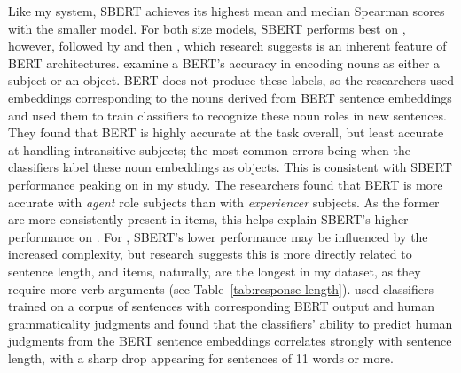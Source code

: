 
Like my system, SBERT achieves its highest mean and median Spearman scores with the smaller model. For both size models, SBERT performs best on , however, followed by  and then , which research suggests is an inherent feature of BERT architectures. \citet{papadimitriou2021multilingual} examine a BERT's accuracy in encoding nouns as either a subject or an object. BERT does not produce these labels, so the researchers used embeddings corresponding to the nouns derived from BERT sentence embeddings and used them to train classifiers to recognize these noun roles in new sentences. They found that BERT is highly accurate at the task overall, but least accurate at handling intransitive subjects; the most common errors being when the classifiers label these noun embeddings as objects. This is consistent with SBERT performance peaking on  in my study. The researchers found that BERT is more accurate with \textit{agent} role subjects than with \textit{experiencer} subjects. As the former are more consistently present in  items, this helps explain SBERT's higher performance on . For , SBERT's lower performance may be influenced by the increased complexity, but research suggests this is more directly related to sentence length, and  items, naturally, are the longest in my dataset, as they require more verb arguments (see Table~\ref{tab:response-length}). \citet{warstadt2019} used classifiers trained on a corpus of sentences with corresponding BERT output and human grammaticality judgments and found that the classifiers' ability to predict human judgments from the BERT sentence embeddings correlates strongly with sentence length, with a sharp drop appearing for sentences of 11 words or more. 

